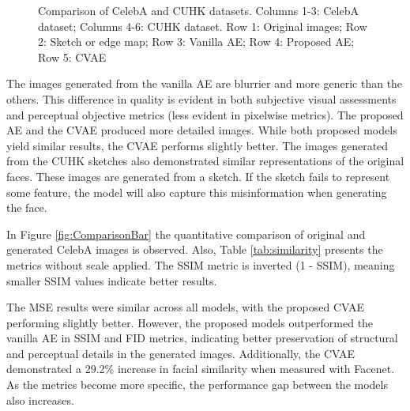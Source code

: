 \documentclass{IEEEcsmag}
\begin{document}
\begin{figure}[ht]
    \caption{Comparison of CelebA and CUHK datasets. Columns 1-3: CelebA dataset; Columns 4-6: CUHK dataset. Row 1: Original images; Row 2: Sketch or edge map; Row 3: Vanilla AE; Row 4: Proposed AE; Row 5: CVAE}
    \label{fig:CombinedComparison}
\end{figure}

The images generated from the vanilla AE are blurrier and more generic than the others. This difference in quality is evident in both subjective visual assessments and perceptual objective metrics (less evident in pixelwise metrics). The proposed AE and the CVAE produced more detailed images. While both proposed models yield similar results, the CVAE performs slightly better. The images generated from the CUHK sketches also demonstrated similar representations of the original faces. These images are generated from a sketch. If the sketch fails to represent some feature, the model will also capture this misinformation when generating the face.

In Figure \ref{fig:ComparisonBar} the quantitative comparison of original and generated CelebA images is observed. Also, Table \ref{tab:similarity} presents the metrics without scale applied. The SSIM metric is inverted (1 - SSIM), meaning smaller SSIM values indicate better results. 

The MSE results were similar across all models, with the proposed CVAE performing slightly better. However, the proposed models outperformed the vanilla AE in SSIM and FID metrics, indicating better preservation of structural and perceptual details in the generated images. Additionally, the CVAE demonstrated a 29.2\% increase in facial similarity when measured with Facenet. As the metrics become more specific, the performance gap between the models also increases.
\end{document}
